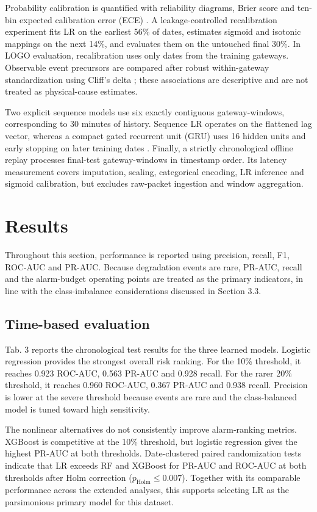 \documentclass{jot}
\begin{document}
Probability calibration is quantified with reliability diagrams, Brier score and ten-bin expected calibration error (ECE) \cite{22,24}. A leakage-controlled recalibration experiment fits LR on the earliest 56\% of dates, estimates sigmoid and isotonic mappings on the next 14\%, and evaluates them on the untouched final 30\%. In LOGO evaluation, recalibration uses only dates from the training gateways. Observable event precursors are compared after robust within-gateway standardization using Cliff's delta \cite{21}; these associations are descriptive and are not treated as physical-cause estimates.

Two explicit sequence models use six exactly contiguous gateway-windows, corresponding to 30 minutes of history. Sequence LR operates on the flattened lag vector, whereas a compact gated recurrent unit (GRU) uses 16 hidden units and early stopping on later training dates \cite{23}. Finally, a strictly chronological offline replay processes final-test gateway-windows in timestamp order. Its latency measurement covers imputation, scaling, categorical encoding, LR inference and sigmoid calibration, but excludes raw-packet ingestion and window aggregation.

\section{Results}\label{s:4}
Throughout this section, performance is reported using precision, recall, F1, ROC-AUC and PR-AUC. Because degradation events are rare, PR-AUC, recall and the alarm-budget operating points are treated as the primary indicators, in line with the class-imbalance considerations discussed in Section 3.3.

\subsection{Time-based evaluation}\label{s:4.1}
Tab. 3 reports the chronological test results for the three learned models. Logistic regression provides the strongest overall risk ranking. For the 10\% threshold, it reaches 0.923 ROC-AUC, 0.563 PR-AUC and 0.928 recall. For the rarer 20\% threshold, it reaches 0.960 ROC-AUC, 0.367 PR-AUC and 0.938 recall. Precision is lower at the severe threshold because events are rare and the class-balanced model is tuned toward high sensitivity.

The nonlinear alternatives do not consistently improve alarm-ranking metrics. XGBoost is competitive at the 10\% threshold, but logistic regression gives the highest PR-AUC at both thresholds. Date-clustered paired randomization tests indicate that LR exceeds RF and XGBoost for PR-AUC and ROC-AUC at both thresholds after Holm correction ($p_{\mathrm{Holm}}\leq0.007$). Together with its comparable performance across the extended analyses, this supports selecting LR as the parsimonious primary model for this dataset.
\end{document}
